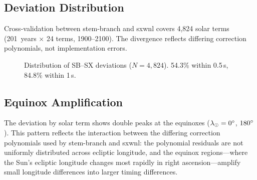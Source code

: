 \documentclass[10pt,a4paper]{article}
\begin{document}
\subsection{Deviation Distribution}

Cross-validation between stem-branch and sxwnl covers 4,824 solar terms
(201~years $\times$ 24 terms, 1900--2100). The divergence reflects
differing correction polynomials, not implementation errors.

\begin{figure}[H]
\centering
{}
\caption{Distribution of SB--SX deviations ($N = 4{,}824$).
54.3\% within 0.5\,s, 84.8\% within 1\,s.}
\label{fig:distribution}
\end{figure}

\subsection{Equinox Amplification}

The deviation by solar term shows double peaks at the equinoxes
($\lambda_\odot = 0\degree$, $180\degree$). This pattern reflects the
interaction between the differing correction polynomials used by
stem-branch and sxwnl: the polynomial residuals are not uniformly
distributed across ecliptic longitude, and the equinox regions---where
the Sun's ecliptic longitude changes most rapidly in right
ascension---amplify small longitude differences into larger timing
differences.
\end{document}
